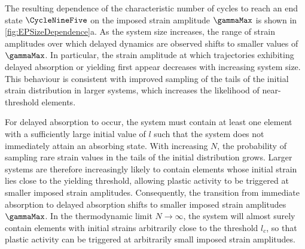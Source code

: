 \documentclass[asymmetricmargins]{library/duthesis}%
\begin{document}
The resulting dependence of the characteristic number of cycles to reach an end state $\CycleNineFive$ on the imposed strain amplitude $\gammaMax$ is shown in \cref{fig:EPSizeDependence}a. As the system size increases, the range of strain amplitudes over which delayed dynamics are observed shifts to smaller values of $\gammaMax$. In particular, the strain amplitude at which trajectories exhibiting delayed absorption or yielding first appear decreases with increasing system size. This behaviour is consistent with improved sampling of the tails of the initial strain distribution in larger systems, which increases the likelihood of near-threshold elements.

For delayed absorption to occur, the system must contain at least one element with a sufficiently large initial value of $l$ such that the system does not immediately attain an absorbing state. With increasing $N$, the probability of sampling rare strain values in the tails of the initial distribution grows. Larger systems are therefore increasingly likely to contain elements whose initial strain lies close to the yielding threshold, allowing plastic activity to be triggered at smaller imposed strain amplitudes. Consequently, the transition from immediate absorption to delayed absorption shifts to smaller imposed strain amplitudes $\gammaMax$. In the thermodynamic limit $N\to\infty$, the system will almost surely contain elements with initial strains arbitrarily close to the threshold $l_c$, so that plastic activity can be triggered at arbitrarily small imposed strain amplitudes. 
\end{document}

